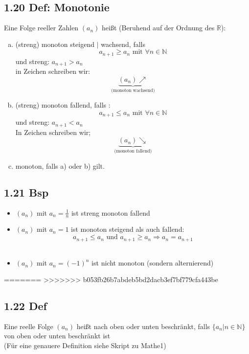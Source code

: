 \documentclass[12pt]{article}
\begin{document}
\subsection*{1.20 Def: Monotonie}
Eine Folge reeller Zahlen $(a_n)$ heißt (Beruhend auf der Ordnung des $\mathbb{R}$):

\begin{enumerate}[a)]
\item (streng) monoton steigend $|$ wachsend, falls
		$$ a_{n+1} \geq a_n \text{      mit } \forall n \in \mathbb{N}$$ 
		{\footnotesize und streng: $ a_{n+1} > a_n $}\\
		in Zeichen schreiben wir:
		$$\underbrace{(a_n)\nearrow }_{\text{(monoton wachsend)}}$$
\item (streng) monoton fallend, falls :\\
	$$a_{n+1} \leq a_n \text{   mit } \forall n \in \mathbb{N}$$
	{\footnotesize und streng: $ a_{n+1} < a_n $}\\
	In Zeichen schreiben wir; 
		$$\underbrace{(a_n)\searrow }_{\text{(monoton fallend)}}$$
\item monoton, falls a) oder b) gilt. 
\end{enumerate}


\subsection*{1.21 Bsp}
\begin{itemize}
	\item $(a_n)$ mit $a_n = \frac{1}{n}$ ist streng monoton fallend\\
	\item $(a_n)$ mit $a_n=1$ ist monoton steigend als auch fallend: 
	$$ a_{n+1} \leq a_n \text{ und } a_{n+1} \geq a_n \Rightarrow a_n = a_{n+1}$$ \\
	\item $(a_n)$ mit $a_n = (-1)^n$  ist nicht monoton (sondern alternierend)
\end{itemize}

=======
>>>>>>> b053fb26b7abdeb5bd2dacb3ef7bf779cfa443be

\subsection*{1.22 Def}
Eine reelle Folge $(a_n)$ heißt nach oben oder unten beschränkt, falls $\{a_n | n \in \mathbb{N}\}$ von oben oder unten beschränkt ist \\
(Für eine genauere Definition siehe Skript zu Mathe1)
\end{document}
